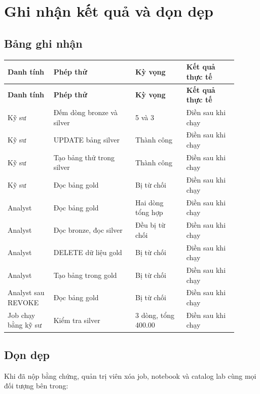 \section{Ghi nhận kết quả và dọn dẹp}

\subsection{Bảng ghi nhận}

\begingroup\small
\renewcommand{\arraystretch}{1.2}
\begin{longtable}{@{}p{0.18\linewidth}p{0.32\linewidth}p{0.2\linewidth}p{0.2\linewidth}@{}}
\toprule
\rowcolor{rowLavender}
\textbf{Danh tính} & \textbf{Phép thử} & \textbf{Kỳ vọng} & \textbf{Kết quả thực tế} \\
\midrule
\endfirsthead
\toprule
\rowcolor{rowLavender}
\textbf{Danh tính} & \textbf{Phép thử} & \textbf{Kỳ vọng} & \textbf{Kết quả thực tế} \\
\midrule
\endhead
\bottomrule
\endfoot
Kỹ sư & Đếm dòng bronze và silver & 5 và 3 & Điền sau khi chạy \\
Kỹ sư & UPDATE bảng silver & Thành công & Điền sau khi chạy \\
Kỹ sư & Tạo bảng thử trong silver & Thành công & Điền sau khi chạy \\
Kỹ sư & Đọc bảng gold & Bị từ chối & Điền sau khi chạy \\
Analyst & Đọc bảng gold & Hai dòng tổng hợp & Điền sau khi chạy \\
Analyst & Đọc bronze, đọc silver & Đều bị từ chối & Điền sau khi chạy \\
Analyst & DELETE dữ liệu gold & Bị từ chối & Điền sau khi chạy \\
Analyst & Tạo bảng trong gold & Bị từ chối & Điền sau khi chạy \\
Analyst sau REVOKE & Đọc bảng gold & Bị từ chối & Điền sau khi chạy \\
Job chạy bằng kỹ sư & Kiểm tra silver & 3 dòng, tổng 400.00 & Điền sau khi chạy \\
\end{longtable}
\endgroup

\subsection{Dọn dẹp}

Khi đã nộp bằng chứng, quản trị viên xóa job, notebook và catalog lab cùng mọi đối tượng bên trong:


